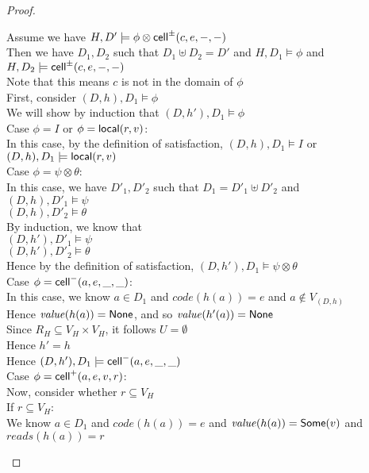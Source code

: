 \begin{proof}
\begin{tabbedproof}
\oo Assume we have $H, D' \models \phi \otimes \mathsf{cell}^{\pm}({c}, {e}, {-}, {-})$ \\
\oo Then we have $D_1, D_2$ such that $D_1 \uplus D_2 = D'$ and $H, D_1 \models \phi$ and $H, D_2 \models \mathsf{cell}^{\pm}({c}, {e}, {-}, {-})$ \\
\oo Note that this means $c$ is not in the domain of $\phi$ \\
\oo First, consider $(D,h), D_1 \models \phi$ \\
\ooo We will show by induction that $(D,h'), D_1 \models \phi$ \\
\ooo Case $\phi = I$ or $\phi = \mathsf{local}({r}, {v})$: \\
\oooo In this case, by the definition of satisfaction, $(D,h), D_1 \models I$ or $(D,h), D_1 \models \mathsf{local}({r}, {v})$\\
\ooo Case $\phi = \psi \otimes \theta$: \\
\oooo In this case, we have $D'_1, D'_2$ such that $D_1 = D'_1 \uplus D'_2$ and \\
\oooox $(D,h), D'_1 \models \psi$ \\
\oooox $(D,h), D'_2 \models \theta$ \\
\oooo By induction, we know that \\
\oooox $(D,h'), D'_1 \models \psi$ \\
\oooox $(D,h'), D'_2 \models \theta$ \\
\oooo Hence by the definition of satisfaction, $(D,h'), D_1 \models \psi \otimes \theta$ \\
\ooo Case $\phi = \mathsf{cell}^{-}({a}, {e}, {\_}, {\_})$: \\
\oooo In this case, we know $a \in D_1$ and $\mathit{code}(h(a)) = e$ and $a \not\in V_{(D,h)}$ \\
\oooo Hence $\mathit{value}(h(a)) = \mathsf{None}$, and so $\mathit{value}(h'(a)) = \mathsf{None}$ \\
\oooo Since $R_H \subseteq V_H \times V_H$, it follows  $U = \emptyset$ \\
\oooo Hence $h' = h$ \\
\oooo Hence $(D,h'), D_1 \models \mathsf{cell}^{-}({a}, {e}, {\_}, {\_})$ \\
\ooo Case $\phi = \mathsf{cell}^{+}({a}, {e}, {v}, {r})$: \\
\oooo Now, consider whether $r \subseteq V_H$ \\
\oooo If $r \subseteq V_H$: \\
\ooooo We know $a \in D_1$ and $\mathit{code}(h(a)) = e$ and 
       $\mathit{value}(h(a)) = \mathsf{Some}(v)$ and $\mathit{reads}(h(a)) = r$ \\

\end{tabbedproof}
\end{proof}
